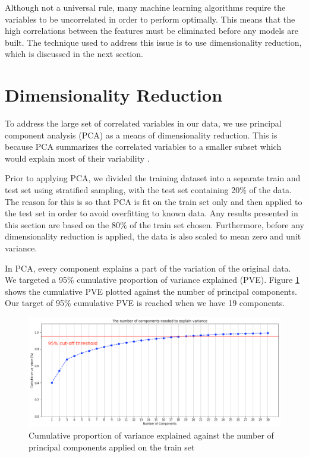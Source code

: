 Although not a universal rule, many machine learning algorithms require the variables to be uncorrelated in order to perform optimally. This means that the high correlations between the features must be eliminated before any models are built. The technique used to address this issue is to use dimensionality reduction, which is discussed in the next section.

\section{Dimensionality Reduction}

To address the large set of correlated variables in our data, we use principal component analysis (PCA) as a means of dimensionality reduction. This is because PCA summarizes the correlated variables to a smaller subset which would explain most of their variability \cite{intro_stat_learning}.

Prior to applying PCA, we divided the training dataset into a separate train and test set using stratified sampling, with the test set containing 20\% of the data. The reason for this is so that PCA is fit on the train set only and then applied to the test set in order to avoid overfitting to known data. Any results presented in this section are based on the 80\% of the train set chosen. Furthermore, before any dimensionality reduction is applied, the data is also scaled to mean zero and unit variance.

In PCA, every component explains a part of the variation of the original data. We targeted a 95\% cumulative proportion of variance explained (PVE). Figure \ref{fig:pve} shows the cumulative PVE plotted against the number of principal components. Our target of 95\% cumulative PVE is reached when we have 19 components.

\begin{figure}
   \centering
   \includegraphics[width=\textwidth]{images/cumulative_pve.png}
   \caption{Cumulative proportion of variance explained against the number of principal components applied on the train set}
   \label{fig:pve}
\end{figure}

